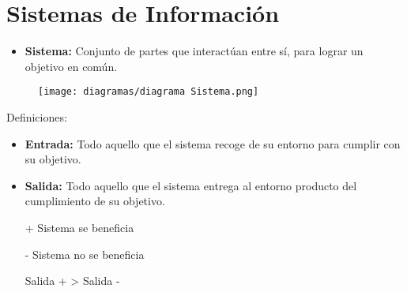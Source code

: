 \documentclass{templateNote}
\begin{document}
\portada
\margenes %

\section{Sistemas de Información}
\begin{itemize}
    \item \textbf{Sistema:} Conjunto de partes que interactúan entre sí, para lograr un objetivo en común.
\end{itemize}
\begin{figure}[H]
    \centering
    \texttt{[image: diagramas/diagrama Sistema.png]}
\end{figure}
Definiciones:
\begin{itemize}
    \item \textbf{Entrada:} Todo aquello que el sistema recoge de su entorno para cumplir con su objetivo.
    \item \textbf{Salida:} Todo aquello que el sistema entrega al entorno producto del cumplimiento de su objetivo.
    
    + Sistema se beneficia
    
    - Sistema no se beneficia
    
    Salida + > Salida -
\end{itemize}
\end{document}
